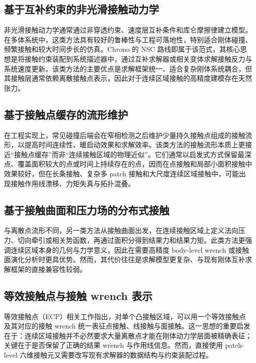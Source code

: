 \label{sec:related}

\subsection{基于互补约束的非光滑接触动力学}

非光滑接触动力学通常通过非穿透约束、速度层互补条件和库仑摩擦律建立模型。在多体系统中，这类方法具有较好的鲁棒性与工程可落地性，特别适合刚体碰撞、频繁接触和较大时间步长的仿真。Chrono 的 NSC 路线即属于该范式，其核心思想是将接触约束装配到系统描述器中，通过互补求解器或相关变体求解接触反力与系统速度更新。该类方法的主要优点是求解框架统一、适合复杂刚体系统耦合，但其接触层通常依赖离散接触点表示，因此对于连续区域接触的高精度建模存在天然张力。

\subsection{基于接触点缓存的流形维护}

在工程实现上，常见碰撞后端会在窄相检测之后维护少量持久接触点组成的接触流形，以提高时间连续性、暖启动效果和求解效率。该类方法的接触流形本质上更接近“接触点缓存”而非“连续接触区域的物理近似”。它们通常以启发式方式保留最深点、覆盖面积较大的点或时间上持续存在的点，因而在点接触和局部小面积接触中效果较好，但在长条接触、复杂多 patch 接触和大尺度连续区域接触中，可能出现接触作用线漂移、力矩失真与拓扑混叠。

\subsection{基于接触曲面和压力场的分布式接触}

与离散点流形不同，另一类方法从接触曲面出发，在连续接触区域上定义法向压力、切向牵引或相关势函数，再通过面积分得到结果力和结果力矩。此类方法更强调连续区域本身的几何与力学意义，因此在需要高精度 body-level wrench 或接触面演化分析时更具优势。然而，其代价往往是求解模型更复杂、与现有刚体互补求解框架的直接兼容性较弱。

\subsection{等效接触点与接触 wrench 表示}

等效接触点（ECP）相关工作指出，对单个凸接触区域，可以用一个等效接触点及其对应的接触 wrench 统一表征点接触、线接触与面接触。这一思想的重要启发在于：连续区域接触并不必然要求大量离散点才能在刚体动力学层面被精确表征；关键在于是否保留了正确的结果 wrench 与作用线信息。然而，直接使用 patch-level 六维接触元又需要改写现有求解器的数据结构与约束装配过程。

